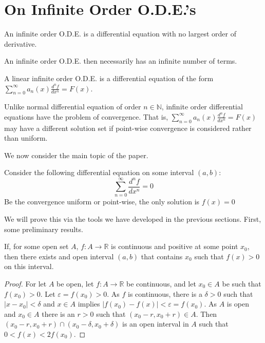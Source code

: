 \documentclass[crop=false,class=book]{standalone}
\begin{document}
\section{On Infinite Order O.D.E.'s}
\begin{definition}
An infinite order O.D.E. is a differential equation with no largest order of derivative.
\end{definition}
\begin{remark}
An infinite order O.D.E. then necessarily has an infinite number of terms.
\end{remark}
\begin{definition}
A linear infinite order O.D.E. is a differential equation of the form $\sum_{n=0}^{\infty} a_n(x) \frac{d^n f}{dx^n} = F(x)$.
\end{definition}
\begin{remark}
Unlike normal differential equation of order $n\in \mathbb{N}$, infinite order differential equations have the problem of convergence. That is, $\sum_{n=0}^{\infty} a_n(x) \frac{d^n f}{dx^n} = F(x)$ may have a different solution set if point-wise convergence is considered rather than uniform.
\end{remark}
We now consider the main topic of the paper.
\begin{proposition}
Consider the following differential equation on some interval $(a,b)$:
\begin{equation}
\nonumber \sum_{n=0}^{\infty} \frac{d^n f}{dx^n} = 0
\end{equation}
Be the convergence uniform or point-wise, the only solution is $f(x)=0$
\end{proposition}
We will prove this via the tools we have developed in the previous sections. First, some preliminary results.
\begin{theorem}
If, for some open set $A$, $f:A\rightarrow \mathbb{R}$ is continuous and positive at some point $x_0$, then there exists and open interval $(a,b)$ that contains $x_0$ such that $f(x)>0$ on this interval.
\end{theorem}
\begin{proof}
For let $A$ be open, let $f:A\rightarrow \mathbb{R}$ be continuous, and let $x_0\in A$ be such that $f(x_0)>0$. Let $\varepsilon = f(x_0)>0$. As $f$ is continuous, there is a $\delta>0$ such that $|x-x_0|<\delta$ and $x\in A$ implies $|f(x_0)-f(x)|<\varepsilon = f(x_0)$. As $A$ is open and $x_0\in A$ there is an $r>0$ such that $(x_0-r,x_0+r)\in A$. Then $(x_0-r,x_0+r)\cap (x_0-\delta,x_0+\delta)$ is an open interval in $A$ such that $0<f(x)<2f(x_0)$.
\end{proof}
\end{document}
